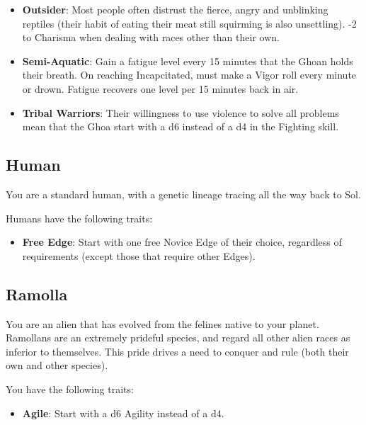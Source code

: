 \documentclass[10pt,twoside]{article}
\begin{document}
\begin{multicols}{2}
\begin{itemize}
            \item \textbf{Outsider}: Most people often distrust the fierce, angry and unblinking reptiles (their habit of eating their meat still squirming is also unsettling). -2 to Charisma when dealing with races other than their own.
            
            \item \textbf{Semi-Aquatic}: Gain a fatigue level every 15 minutes that the Ghoan holds their breath. On reaching Incapcitated, must make a Vigor roll every minute or drown. Fatigue recovers one level per 15 minutes back in air.
            
            \item \textbf{Tribal Warriors}: Their willingness to use violence to solve all problems mean that the Ghoa start with a d6 instead of a d4 in the Fighting skill.
            
        \end{itemize}

        \subsection{Human}
        
        You are a standard human, with a genetic lineage tracing all the way back to Sol.
        
        Humans have the following traits:
        
        \begin{itemize}
            \item \textbf{Free Edge}: Start with one free Novice Edge of their choice, regardless of requirements (except those that require other Edges).
        \end{itemize}

        \subsection{Ramolla}
        
        You are an alien that has evolved from the felines native to your planet. Ramollans are an extremely prideful species, and regard all other alien races as inferior to themselves. This pride drives a need to conquer and rule (both their own and other species).
        
        You have the following traits:
        
        \begin{itemize}
            \item \textbf{Agile}: Start with a d6 Agility instead of a d4.


\end{itemize}
\end{multicols}
\end{document}
